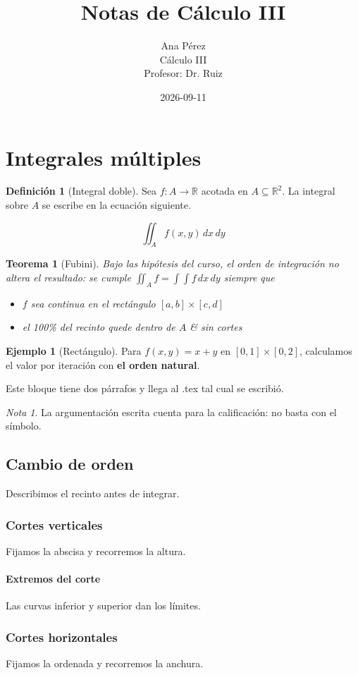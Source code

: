\documentclass[11pt]{article}
\title{Notas de Cálculo III}
\author{Ana Pérez \\ Cálculo III \\ Profesor: Dr. Ruiz}
\date{2026-09-11}
\theoremstyle{plain}
\newtheorem{theorem}{Teorema}
\theoremstyle{definition}
\newtheorem{definition}{Definición}
\newtheorem{example}{Ejemplo}
\theoremstyle{remark}
\newtheorem{note}{Nota}
\begin{document}
\maketitle

\section{Integrales múltiples}

\begin{definition}[Integral doble]
Sea $f: A \to \mathbb{R}$ acotada en $A \subseteq \mathbb{R}^2$. La integral sobre $A$ se escribe en la ecuación siguiente.
\end{definition}

\[
\iint_A f(x,y) \, dx \, dy
\]

\begin{theorem}[Fubini]
Bajo las hipótesis del curso, el orden de integración no altera el resultado: se cumple $\iint_A f = \int \! \int f \, dx \, dy$ siempre que
\begin{itemize}
\item $f$ sea continua en el rectángulo $[a,b] \times [c,d]$
\item el 100\% del recinto quede dentro de $A$ \& sin cortes
\end{itemize}
\end{theorem}

\begin{example}[Rectángulo]
Para $f(x,y)=x+y$ en $[0,1] \times [0,2]$, calculamos el valor por iteración con \textbf{el orden natural}.

Este bloque tiene dos párrafos y llega al .tex tal cual se escribió.
\end{example}

\begin{note}
La argumentación escrita cuenta para la calificación: no basta con el símbolo.
\end{note}

\subsection{Cambio de orden}
Describimos el recinto antes de integrar.

\subsubsection{Cortes verticales}
Fijamos la abscisa y recorremos la altura.

\paragraph{Extremos del corte}
Las curvas inferior y superior dan los límites.

\subsubsection{Cortes horizontales}
Fijamos la ordenada y recorremos la anchura.
\end{document}
